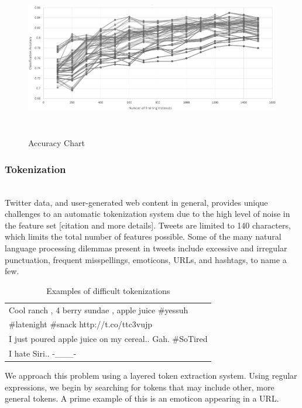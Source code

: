 \documentclass[letterpaper]{article}
\begin{document}
\begin{figure}[t!]
\centering
\includegraphics[height=7cm]{chart}
\caption{Accuracy Chart}
\label{fig:chart}
\end{figure}

\subsubsection{Tokenization}
~\\
Twitter data, and user-generated web content in general, provides unique challenges to an automatic tokenization system due to the high level of noise in the feature set [citation and more details]. Tweets are limited to 140 characters, which limits the total number of features possible. Some of the many natural language processing dilemmas present in tweets include excessive and irregular punctuation, frequent misspellings, emoticons, URLs, and hashtags, to name a few.\\

\begin{table}[h]
\centering
\begin{tabular}{|l|}
	\hline
	Cool ranch , 4 berry sundae , apple juice \#yessuh \\ \#latenight \#snack http://t.co/ttc3vujp \\ \hline
	I just poured apple juice on my cereal.. Gah. \#SoTired \\ \hline
	I hate Siri.. -\_\_\_- \\
	\hline
\end{tabular}
\caption{Examples of difficult tokenizations}
\label{tab:tokenization_examples}
\end{table}

We approach this problem using a layered token extraction system. Using regular expressions, we begin by searching for tokens that may include other, more general tokens. A prime example of this is an emoticon appearing in a URL.
\end{document}
